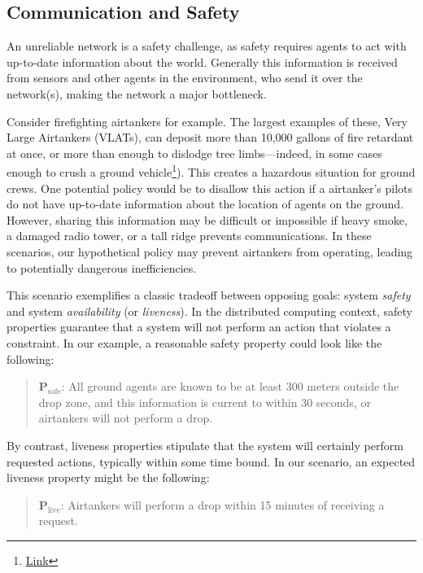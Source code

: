 \documentclass[]             %
{NASA}                       %
\theoremstyle{definition}
\begin{document}
\hypertarget{communication-and-safety}{%
\subsection{Communication and Safety}\label{communication-and-safety}}

An unreliable network is a safety challenge, as safety requires agents
to act with up-to-date information about the world. Generally this
information is received from sensors and other agents in the
environment, who send it over the network(s), making the network a major
bottleneck.

Consider firefighting airtankers for example. The largest examples of
these, Very Large Airtankers (VLATs), can deposit more than 10,000
gallons of fire retardant at once, or more than enough to dislodge tree
limbs---indeed, in some cases enough to crush a ground
vehicle\footnote{\href{https://www.youtube.com/watch?v=ONdSoiI4zIA}{Link}}).
This creates a hazardous situation for ground crews. One potential
policy would be to disallow this action if a airtanker's pilots do not
have up-to-date information about the location of agents on the ground.
However, sharing this information may be difficult or impossible if
heavy smoke, a damaged radio tower, or a tall ridge prevents
communications. In these scenarios, our hypothetical policy may prevent
airtankers from operating, leading to potentially dangerous
inefficiencies.

This scenario exemplifies a classic tradeoff between opposing goals:
system \emph{safety} and system \emph{availability} (or
\emph{liveness}). In the distributed computing context, safety
properties guarantee that a system will not perform an action that
violates a constraint. In our example, a reasonable safety property
could look like the following:

\begin{quote}
    $\textbf{P}_\textrm{safe}$: All ground agents are
known to be at least 300 meters outside the drop zone, and this
information is current to within 30 seconds, or airtankers will not perform a
drop.
\end{quote}

\noindent By contrast, liveness properties stipulate that the system
will certainly perform requested actions, typically within some time
bound. In our scenario, an expected liveness property might be the
following:

\begin{quote}
    $\textbf{P}_\textrm{live}$:
    Airtankers will perform a drop within 15 minutes of receiving a request.
\end{quote}
\end{document}
